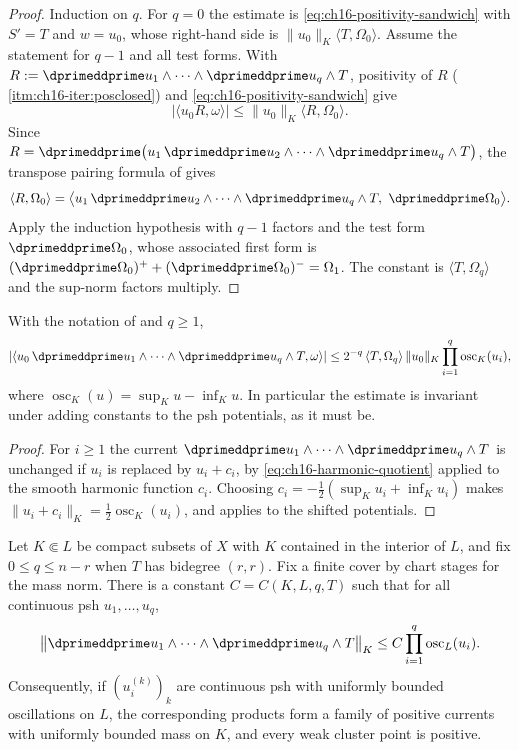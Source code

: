 \begin{proof}
Induction on $q$.  For $q=0$ the estimate is
\eqref{eq:ch16-positivity-sandwich} with $S'=T$ and $w=u_0$, whose right-hand
side is $\|u_0\|_K\langle T,\Omega_0\rangle$.  Assume the statement for
$q-1$ and all test forms.  With $R:=\dprimeddprime u_1\wedge\cdots
\wedge\dprimeddprime u_q\wedge T$, positivity of $R$
(\,\cref{itm:ch16-iter:posclosed}) and
\eqref{eq:ch16-positivity-sandwich} give
\[
 |\langle u_0R,\omega\rangle|\leq\|u_0\|_K\langle R,\Omega_0\rangle .
\]
Since $R=\dprimeddprime\bigl(u_1\,\dprimeddprime u_2\wedge\cdots
\wedge\dprimeddprime u_q\wedge T\bigr)$, the transpose pairing
formula of  gives
\[
 \langle R,\Omega_0\rangle
 =\bigl\langle u_1\,\dprimeddprime u_2\wedge\cdots
   \wedge\dprimeddprime u_q\wedge T,\ \dprimeddprime\Omega_0\bigr\rangle .
\]
Apply the induction hypothesis with $q-1$ factors and the test form
$\dprimeddprime\Omega_0$, whose associated first form is
$(\dprimeddprime\Omega_0)^++(\dprimeddprime\Omega_0)^-=\Omega_1$.  The
constant is $\langle T,\Omega_q\rangle$ and the sup-norm factors multiply.
\end{proof}

\begin{corollary}
\label{cor:ch16-cln-oscillation}
With the notation of  and $q\geq1$,
\[
 \left|\left\langle
   u_0\,\dprimeddprime u_1\wedge\cdots\wedge\dprimeddprime u_q\wedge T,
   \omega\right\rangle\right|
 \leq 2^{-q}\,\langle T,\Omega_q\rangle\,\|u_0\|_K
   \prod_{i=1}^q\operatorname{osc}_K(u_i),
\]
where $\operatorname{osc}_K(u)=\sup_Ku-\inf_Ku$.  In particular the estimate
is invariant under adding constants to the psh potentials, as it must be.
\end{corollary}

\begin{proof}
For $i\geq1$ the current
$\dprimeddprime u_1\wedge\cdots\wedge\dprimeddprime u_q\wedge T$ is unchanged
if $u_i$ is replaced by $u_i+c_i$, by
\eqref{eq:ch16-harmonic-quotient} applied to the smooth harmonic function
$c_i$.  Choosing
$c_i=-\tfrac12(\sup_Ku_i+\inf_Ku_i)$ makes
$\|u_i+c_i\|_K=\tfrac12\operatorname{osc}_K(u_i)$, and
 applies to the shifted potentials.
\end{proof}

\begin{corollary}
\label{cor:ch16-cln-mass}
Let $K\Subset L$ be compact subsets of $X$ with $K$ contained in the
interior of $L$, and fix $0\leq q\leq n-r$ when $T$ has bidegree
$(r,r)$.  Fix a finite cover by chart stages for the mass norm.  There is a
constant $C=C(K,L,q,T)$ such that
for all continuous psh $u_1,\ldots,u_q$,
\[
 \bigl\|\dprimeddprime u_1\wedge\cdots\wedge
   \dprimeddprime u_q\wedge T\bigr\|_K
 \leq C\prod_{i=1}^q\operatorname{osc}_L(u_i).
\]
Consequently, if $(u_i^{(k)})_k$ are continuous psh with uniformly bounded
oscillations on $L$, the corresponding products form a family of positive
currents with uniformly bounded mass on $K$, and every weak cluster point is
positive.
\end{corollary}

